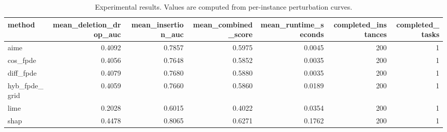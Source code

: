 \begin{table}[t]
\caption{Experimental results. Values are computed from per-instance perturbation curves.}
\label{tab:main_results_computed}
\centering
\begin{tabular}{lrrrrrr}
\toprule
method & mean\_deletion\_drop\_auc & mean\_insertion\_auc & mean\_combined\_score & mean\_runtime\_seconds & completed\_instances & completed\_tasks \\
\midrule
aime & 0.4092 & 0.7857 & 0.5975 & 0.0045 & 200 & 1 \\
cos\_fpde & 0.4056 & 0.7648 & 0.5852 & 0.0035 & 200 & 1 \\
diff\_fpde & 0.4079 & 0.7680 & 0.5880 & 0.0035 & 200 & 1 \\
hyb\_fpde\_grid & 0.4059 & 0.7660 & 0.5860 & 0.0189 & 200 & 1 \\
lime & 0.2028 & 0.6015 & 0.4022 & 0.0354 & 200 & 1 \\
shap & 0.4478 & 0.8065 & 0.6271 & 0.1762 & 200 & 1 \\
\bottomrule
\end{tabular}

\end{table}
